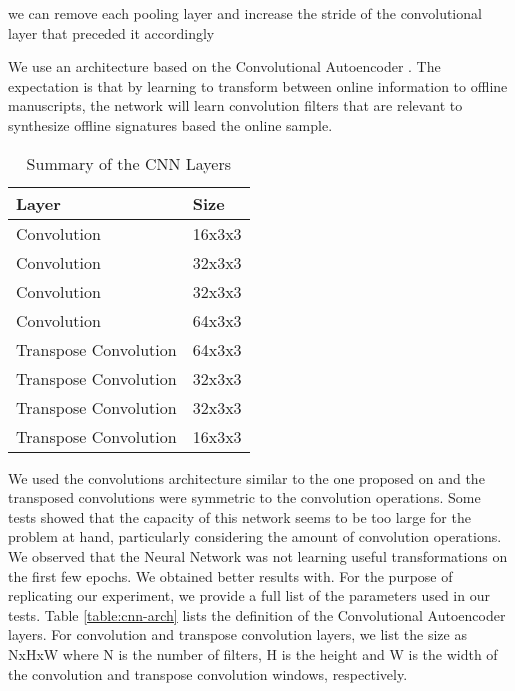 \cite{springenberg2014striving}  we can remove each pooling layer and increase the stride of the convolutional layer that preceded it accordingly

We use an architecture based on the Convolutional Autoencoder \cite{masci2011stacked}. The expectation is that by learning to transform between online information to offline manuscripts, the network will learn convolution filters that are relevant to synthesize offline signatures based the online sample.


\begin{table}[!htb]
\renewcommand{\arraystretch}{1.3}
\caption{Summary of the CNN Layers}
\label{cnn-arch}
\centering
\begin{tabular}{|l|l|}
\hline
\textbf{Layer}        & \textbf{Size} \\ \hline
Convolution           & 16x3x3        \\ \hline
Convolution           & 32x3x3        \\ \hline
Convolution           & 32x3x3        \\ \hline
Convolution           & 64x3x3        \\ \hline
Transpose Convolution & 64x3x3        \\ \hline
Transpose Convolution & 32x3x3        \\ \hline
Transpose Convolution & 32x3x3        \\ \hline
Transpose Convolution & 16x3x3        \\ \hline
\end{tabular}
\end{table}



We used the convolutions architecture similar to the one proposed on \cite{simonyan2014very} and the transposed convolutions were symmetric to the convolution operations. Some tests showed that the capacity of this network seems to be
too large for the problem at hand, particularly considering the
amount of convolution operations. We observed that the Neural Network was not learning useful transformations on the first few epochs. We obtained better results with. For the purpose of replicating our experiment, we provide a full list of the parameters used in our tests. Table \ref{table:cnn-arch} lists the definition of the Convolutional Autoencoder layers. For convolution and
transpose convolution layers, we list the size as NxHxW where N is the
number of filters, H is the height and W is the width of the
convolution and transpose convolution windows, respectively. 

